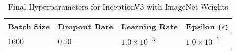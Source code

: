 \begin{table}[H]
    \centering
    \begin{tabular}{@{}llll@{}}
    \toprule
    Batch Size & Dropout Rate & Learning Rate         & Epsilon (\(\epsilon\))   \\ \midrule
    1600       & 0.20         & \(1.0 \times 10^{-3}\) & \(1.0 \times 10^{-7}\) \\ \bottomrule
    \end{tabular}
    \caption{Final Hyperparameters for InceptionV3 with ImageNet Weights}\label{tab:final-hyperparameters}
\end{table}